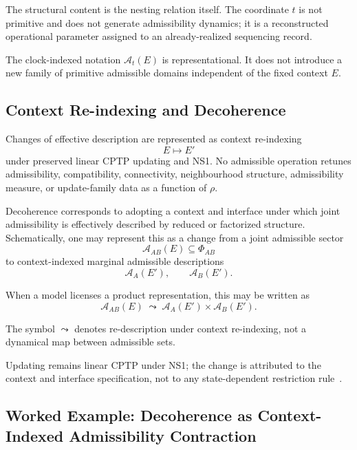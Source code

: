 \documentclass[aps,prx,onecolumn,11pt]{revtex4-2}
\theoremstyle{plain}
\theoremstyle{definition}
\theoremstyle{remark}
\begin{document}
The structural content is the nesting relation itself. The coordinate
\(t\) is not primitive and does not generate admissibility dynamics; it
is a reconstructed operational parameter assigned to an already-realized
sequencing record.

The clock-indexed notation \(\mathcal A_t(E)\) is representational. It
does not introduce a new family of primitive admissible domains
independent of the fixed context \(E\).

\subsection{Context Re-indexing and Decoherence}
\label{subsec:cd_context_reindex_factorization}

Changes of effective description are represented as context re-indexing
\[
E\mapsto E'
\]
under preserved linear CPTP updating and NS1. No admissible operation
retunes admissibility, compatibility, connectivity, neighbourhood
structure, admissibility measure, or update-family data as a function of
\(\rho\).

Decoherence corresponds to adopting a context and interface under which
joint admissibility is effectively described by reduced or factorized
structure. Schematically, one may represent this as a change from a
joint admissible sector
\[
\mathcal{A}_{AB}(E)\subseteq\Phi_{AB}
\]
to context-indexed marginal admissible descriptions
\[
\mathcal{A}_A(E'),
\qquad
\mathcal{A}_B(E').
\]

When a model licenses a product representation, this may be written as
\begin{equation}
\mathcal{A}_{AB}(E)
\;\leadsto\;
\mathcal{A}_A(E')\times\mathcal{A}_B(E').
\label{eq:cd_decoh_factorization_map}
\end{equation}

The symbol \(\leadsto\) denotes re-description under context
re-indexing, not a dynamical map between admissible sets.

Updating remains linear CPTP under NS1; the change is attributed to the
context and interface specification, not to any state-dependent
restriction rule~\cite{Zurek2003,Schlosshauer2007,BreuerPetruccione2002,
Watrous2018}.

\subsection{Worked Example: Decoherence as Context-Indexed Admissibility Contraction}
\label{sec:decoherence-admissibility-contraction}
\end{document}
